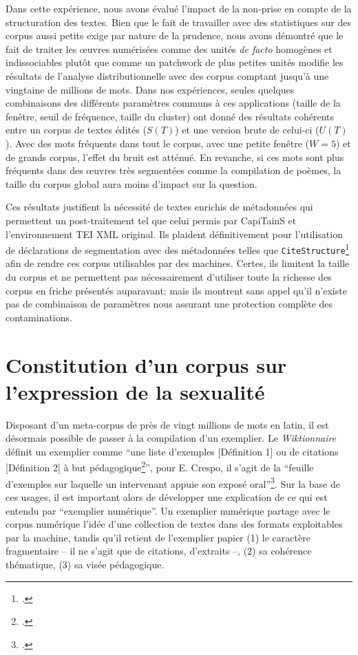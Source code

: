 Dans cette expérience, nous avons évalué l'impact de la non-prise en compte de la structuration des textes. Bien que le fait de travailler avec des statistiques sur des corpus aussi petits exige par nature de la prudence, nous avons démontré que le fait de traiter les œuvres numérisées comme des unités \textit{de facto} homogènes et indissociables plutôt que comme un patchwork de plus petites unités modifie les résultats de l'analyse distributionnelle avec des corpus comptant jusqu'à une vingtaine de millions de mots. Dans nos expériences, seules quelques combinaisons des différents paramètres communs à ces applications (taille de la fenêtre, seuil de fréquence, taille du cluster) ont donné des résultats cohérents entre un corpus de textes édités ($S(T)$) et une version brute de celui-ci ($U(T)$). Avec des mots fréquents dans tout le corpus, avec une petite fenêtre ($W=5$) et de grands corpus, l'effet du bruit est atténué. En revanche, si ces mots sont plus fréquents dans des œuvres très segmentées comme la compilation de poèmes, la taille du corpus global aura moins d'impact sur la question. 

Ces résultats justifient la nécessité de textes enrichis de métadonnées qui permettent un post-traitement tel que celui permis par CapiTainS et l'environnement TEI XML original. Ils plaident définitivement pour l'utilisation de déclarations de segmentation avec des métadonnées telles que \texttt{CiteStructure}\footcite{cayless_introducing_2021} afin de rendre ces corpus utilisables par des machines. Certes, ils limitent la taille du corpus et ne permettent pas nécessairement d'utiliser toute la richesse des corpus en friche présentés auparavant: mais ils montrent sans appel qu'il n'existe pas de combinaison de paramètres nous assurant une protection complète des contaminations.


\section{Constitution d’un corpus sur l’expression de la sexualité} 

Disposant d'un meta-corpus de près de vingt millions de mots en latin, il est désormais possible de passer à la compilation d'un exemplier. Le \textit{Wiktionnaire} définit un exemplier comme \enquote{une liste d’exemples [Définition 1] ou de citations [Définition 2] à but pédagogique\footcite{noauthor_exemplier_2019}}, pour E. Crespo, il s'agit de la \enquote{feuille
d’exemples sur laquelle un intervenant appuie son exposé oral}\footcite{crespo2011pour}. Sur la base de ces usages, il est important alors de développer une explication de ce qui est entendu par \enquote{exemplier numérique}. Un exemplier numérique partage avec le corpus numérique l'idée d'une collection de textes dans des formats exploitables par la machine, tandis qu'il retient de l'exemplier papier (1) le caractère fragmentaire -- il ne s'agit que de citations, d'extraits --, (2) sa cohérence thématique, (3) sa visée pédagogique. 

